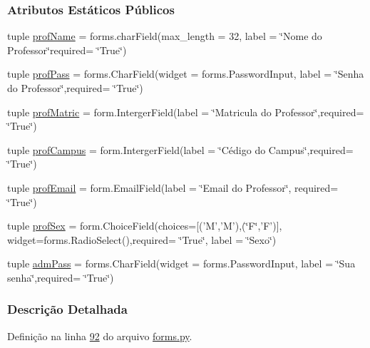 \subsubsection*{Atributos Estáticos Públicos}
\begin{DoxyCompactItemize}
\item 
tuple \hyperlink{classAdm_1_1forms_1_1AdmRegProfForm_aec9f5746e7eb7f389c0f159780dd71fa}{prof\-Name} = forms.\-char\-Field(max\-\_\-length = 32, label = \char`\"{}Nome do Professor\char`\"{}required= \char`\"{}True\char`\"{})
\item 
tuple \hyperlink{classAdm_1_1forms_1_1AdmRegProfForm_afe9e2e7368001ac81851ece8b42ccb57}{prof\-Pass} = forms.\-Char\-Field(widget = forms.\-Password\-Input, label = \char`\"{}Senha do Professor\char`\"{},required= \char`\"{}True\char`\"{})
\item 
tuple \hyperlink{classAdm_1_1forms_1_1AdmRegProfForm_ac53b20321fbc980c896f534229c68ff1}{prof\-Matric} = form.\-Interger\-Field(label = \char`\"{}Matricula do Professor\char`\"{},required= \char`\"{}True\char`\"{})
\item 
tuple \hyperlink{classAdm_1_1forms_1_1AdmRegProfForm_a0c90beb927b61260feb194030798db38}{prof\-Campus} = form.\-Interger\-Field(label = \char`\"{}Cédigo do Campus\char`\"{},required= \char`\"{}True\char`\"{})
\item 
tuple \hyperlink{classAdm_1_1forms_1_1AdmRegProfForm_a56c1eca35253b136bf8886135c9633b0}{prof\-Email} = form.\-Email\-Field(label = \char`\"{}Email do Professor\char`\"{}, required= \char`\"{}True\char`\"{})
\item 
tuple \hyperlink{classAdm_1_1forms_1_1AdmRegProfForm_ab910e0448e7d6dac759c1cdcb24a4314}{prof\-Sex} = form.\-Choice\-Field(choices=\mbox{[}('M','M'),(\char`\"{}F\char`\"{},'F')\mbox{]}, widget=forms.\-Radio\-Select(),required= \char`\"{}True\char`\"{}, label = \char`\"{}Sexo\char`\"{})
\item 
tuple \hyperlink{classAdm_1_1forms_1_1AdmRegProfForm_aa9a564546d369e53f8512a473669b78d}{adm\-Pass} = forms.\-Char\-Field(widget = forms.\-Password\-Input, label = \char`\"{}Sua senha\char`\"{},required= \char`\"{}True\char`\"{})
\end{DoxyCompactItemize}


\subsubsection{Descrição Detalhada}


Definição na linha \hyperlink{Adm_2forms_8py_source_l00092}{92} do arquivo \hyperlink{Adm_2forms_8py_source}{forms.\-py}.



